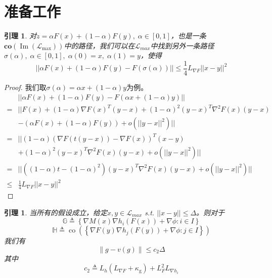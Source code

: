 \documentclass[macfonts]{njuthesis}
\newtheorem{lem}[thm]{引理}
\begin{document}
\section{准备工作}

\begin{lem}
\label{approxco}
对$z=\alpha F(x)+(1-\alpha)F(y),\; \alpha \in [0,1]$，也是一条$\mathbf{c o}\left(\operatorname{Im}\left(\mathcal{L}_{\max }\right)\right)$中的路径，我们可以在$\mathcal{L}_{max}$中找到另外一条路径$\sigma(\alpha),\; \alpha\in[0,1],\;\alpha(0)=x,\;\alpha(1)=y$，使得
$$
||\alpha F(x)+(1-\alpha)F(y)-F(\sigma(\alpha))||\leq \frac{1}{4}L_{\nabla F}||x-y||^2
$$

\end{lem}

\begin{proof}
我们取$\sigma(\alpha)=\alpha x+(1-\alpha)y$为例。
\begin{equation}
\begin{aligned}
&||\alpha F(x)+(1-\alpha)F(y)-F(\alpha x+(1-\alpha)y)||\\
=&||F(x)+(1-\alpha)\nabla F(x)^T(y-x) +(1-\alpha)^2(y-x)^T\nabla^2F(x)(y-x)\\
&-(\alpha F(x)+(1-\alpha)F(y))+o(||y-x||^2)||\\
=&||(1-\alpha)(\nabla F(t(y-x))-\nabla F(x))^T(x-y)\\
&+(1-\alpha)^2(y-x)^T\nabla^2F(x)(y-x)+o(||y-x||^2)||\\
=&||((1-\alpha)t-(1-\alpha)^2)(y-x)^T\nabla^2F(x)(y-x)+o(||y-x||^2)||\\
\leq&\frac{1}{4}L_{\nabla F}||x-y||^2
\end{aligned}
\end{equation}

\end{proof}

\begin{lem}
\label{approxg}
当所有的假设成立，给定$x, y\in \mathcal{L}_{max}$ s.t. $||x-y||\leq \Delta$。则对于
$$
\mathbb{G} \triangleq\left\{\nabla M(x) \nabla h_{i}(F(x))+\nabla \phi: i \in I\right\}
$$
$$
\mathbb{H} \triangleq \operatorname{co}\left(\left\{\nabla F(y) \nabla h_{j}(F(y))+\nabla\phi: j \in I\right\}\right)
$$
我们有
$$
\|g-v(g)\| \leq c_{2} \Delta
$$
其中
$$
c_{2} \triangleq L_{h}\left(L_{\nabla F}+\kappa_{\mathrm{g}}\right)+L_{F}^{2} L_{\nabla h_{i}}
$$
\end{lem}
\end{document}
